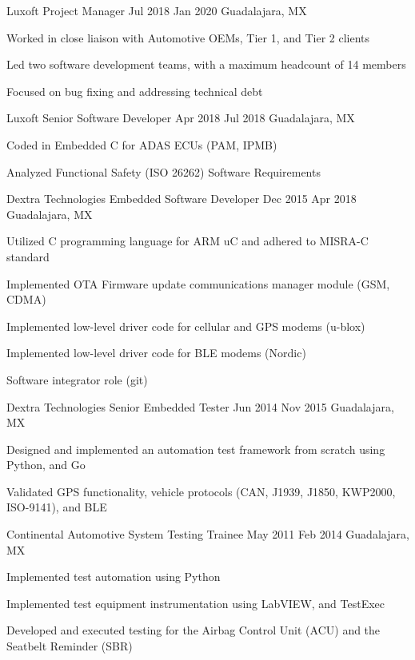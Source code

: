 \documentclass{resume} %
\begin{document}
\job
    {Luxoft}
    {Project Manager}
    {Jul 2018}
    {Jan 2020}
    {Guadalajara, MX}
    {
    \begin{itemize-bullets}
    \item{Worked in close liaison with Automotive OEMs, Tier 1, and Tier 2 clients}
    \item{Led two software development teams, with a maximum headcount of 14 members}
    \item{Focused on bug fixing and addressing technical debt}
    \end{itemize-bullets}
    }


\job
    {Luxoft}
    {Senior Software Developer}
    {Apr 2018}
    {Jul 2018}
    {Guadalajara, MX}
    {
    \begin{itemize-bullets}
    \item{Coded in Embedded C for ADAS ECUs (PAM, IPMB)}
    \item{Analyzed Functional Safety (ISO 26262) Software Requirements}
    \end{itemize-bullets}
    }


\job
    {Dextra Technologies}
    {Embedded Software Developer}
    {Dec 2015}
    {Apr 2018}
    {Guadalajara, MX}
    {
    \begin{itemize-bullets}
    \item{Utilized C programming language for ARM uC and adhered to MISRA-C standard}
    \item{Implemented OTA Firmware update communications manager module (GSM, CDMA)}
    \item{Implemented low-level driver code for cellular and GPS modems (u-blox)}
    \item{Implemented low-level driver code for BLE modems (Nordic)}
    \item{Software integrator role (git)}
    \end{itemize-bullets}
    }


\job
    {Dextra Technologies}
    {Senior Embedded Tester}
    {Jun 2014}
    {Nov 2015}
    {Guadalajara, MX}
    {
    \begin{itemize-bullets}
    \item{Designed and implemented an automation test framework from scratch using Python, and Go}
    \item{Validated GPS functionality, vehicle protocols (CAN, J1939, J1850, KWP2000, ISO-9141), and BLE}
    \end{itemize-bullets}
    }


\job
    {Continental Automotive}
    {System Testing Trainee}
    {May 2011}
    {Feb 2014}
    {Guadalajara, MX}
    {
    \begin{itemize-bullets}
    \item{Implemented test automation using Python}
    \item{Implemented test equipment instrumentation using LabVIEW, and TestExec}
    \item{Developed and executed testing for the Airbag Control Unit (ACU) and the Seatbelt Reminder (SBR)}
    \end{itemize-bullets}
    }
\end{document}
